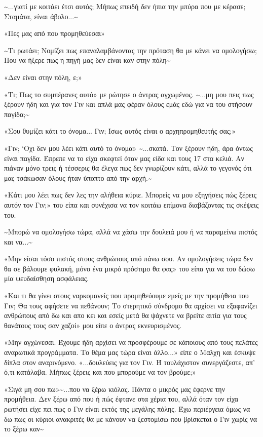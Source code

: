 \documentclass[12pt,twoside, openany]{book}
\begin{document}
\textasciitilde ...γιατί με κοιτάει έτσι αυτός; Μήπως επειδή δεν ήπια την μπύρα που με κέρασε; Σταμάτα, είναι άβολο...\textasciitilde 

«Πες μας από που προμηθεύεσαι»

\textasciitilde Τι ρωτάει; Νομίζει πως επαναλαμβάνοντας την πρόταση θα με κάνει να ομολογήσω; Που να ήξερε πως η πηγή μας δεν είναι καν στην πόλη\textasciitilde 

«Δεν είναι στην πόλη, ε;»

«Τι; Πως το συμπέρανες αυτό» με ρώτησε ο άντρας αγχωμένος. \textasciitilde ...μη μου πεις πως ξέρουν ήδη και για τον Γιν και απλά μας φέραν όλους εμάς εδώ για να του στήσουν παγίδα;\textasciitilde 

«Σου θυμίζει κάτι το όνομα... Γιν; Ίσως αυτός είναι ο αρχηπρομηθευτής σας;»

«Γιν; ‘Οχι δεν μου λέει κάτι αυτό το όνομα» \textasciitilde ...σκατά. Τον ξέρουν ήδη, άρα όντως είναι παγίδα. Έπρεπε να το είχα σκεφτεί όταν μας είδα και τους 17 στα κελιά. Αν πιάναν μόνο τρεις ή τέσσερις θα έλεγα πως δεν γνωρίζουν κάτι, αλλά το γεγονός ότι μας τσάκωσαν όλους ήταν ύποπτο από την αρχή.\textasciitilde 

«Κάτι μου λέει πως δεν λες την αλήθεια κύριε. Μπορείς να μου εξηγήσεις πώς ξέρεις αυτόν τον Γιν;» του είπα και συνέχισα να τον κοιτάω επίμονα διαβάζοντας τις σκέψεις του.

\textasciitilde Μπορώ να ομολογήσω τώρα, αλλά να χάσω την δουλειά μου ή να παραμείνω πιστός και να...\textasciitilde 

«Μην είσαι τόσο πιστός στους ανθρώπους από πάνω σου. Αν ομολογήσεις τώρα δεν θα σε βάλουμε φυλακή, μόνο ένα μικρό πρόστιμο θα φας» του είπα για να του δώσω μία ψευδαίσθηση ασφάλειας.

«Και τι θα γίνει στους ναρκομανείς που προμηθεύουμε εμείς με την προμήθεια του Γιν; Θα τους αφήσετε να πεθάνουν; Το στερητικό σύνδρομο θα αρχίσει να εξαφανίζει ανθρώπους από δω και απο κει και εσείς μετά θα ψάχνετε να βρείτε αιτία για τους θανάτους τους σαν χαζοί» μου είπε ο άντρας εκνευρισμένος.

«Μην αγχώνεσαι. Έχουμε ήδη αρχίσει να προσφέρουμε σε κάποιους από τους πελάτες αναρωτικά προγράμματα. Το θέμα μας τώρα είναι άλλο...» είπε ο Μαλχη και έσκυψε δίπλα στον αναρινόμενο. «...δουλεύεις για τον Γιν. Ή τουλάχιστον συνεργάζεστε, απ’ ό,τι κατάλαβα. Μήπως ξέρεις και που μπορούμε να τον βρούμε;»

«Σιγά μη σου πω»\textasciitilde ...που να ξέρω κιόλας. Πάντα ο μικρός μας έφερνε την προμήθεια. Δεν ξέρω από που ή πώς έφτανε στα χέρια του, αλλά όταν τον είχα ρωτήσει είχε πει πως ο Γιν είναι εκτός της μεγάλης πόλης. Έχω περιέργεια όμως να δω πως οι κύριοι ανακριτές θα με κάνουν να ξεστομίσω που βρίσκεται ο Γιν χωρίς να το ξέρω καν\textasciitilde 
\end{document}
